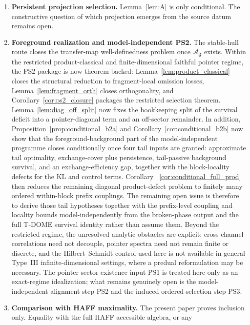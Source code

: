 \documentclass[12pt]{article}
\theoremstyle{definition}
\theoremstyle{remark}
\begin{document}
\begin{enumerate}
\item \textbf{Persistent projection selection.} Lemma~\ref{lem:A} is
  only conditional. The constructive question of which projection
  emerges from the source datum remains open.
\item \textbf{Foreground realization and model-independent PS2.} The
  stable-hull route closes the transfer-map well-definedness problem
  once \(\mathcal A_{\mathfrak F}\) exists. Within the restricted
  product-classical and finite-dimensional faithful pointer regime, the
  PS2 package is now theorem-backed:
  Lemma~\ref{lem:product_classical} closes the structural reduction to
  fragment-local omission losses, Lemma~\ref{lem:fragment_orth} closes
  orthogonality, and Corollary~\ref{cor:ps2_closure} packages the
  restricted selection theorem. Lemma~\ref{lem:diag_off_split} now
  fixes the bookkeeping split of the survival deficit into a
  pointer-diagonal term and an off-sector remainder. In addition,
  Proposition~\ref{prop:conditional_b2a} and
  Corollary~\ref{cor:conditional_b2b} now show that the
  foreground-background part of the model-independent programme closes
  conditionally once four tail inputs are granted: approximate tail
  optimality, exchange-cover plus persistence, tail-passive background
  survival, and an exchange-efficiency gap, together with the
  block-locality defects for the KL and control terms. Corollary~
  \ref{cor:conditional_full_prod} then reduces the remaining diagonal
  product-defect problem to finitely many ordered within-block prefix
  couplings. The remaining open issue is therefore to derive those tail
  hypotheses together with the prefix-level coupling and locality
  bounds model-independently from the broken-phase output and the full
  T-DOME survival identity rather than assume them. Beyond the
  restricted regime, the unresolved analytic obstacles are explicit:
  cross-channel correlations need not decouple, pointer spectra need
  not remain finite or discrete, and the Hilbert--Schmidt control used
  here is not available in general Type~III infinite-dimensional
  settings, where a predual reformulation may be necessary. The
  pointer-sector existence input PS1 is treated here only as an
  exact-regime idealization; what remains genuinely open is the
  model-independent alignment step PS2 and the induced ordered-selection
  step PS3.
\item \textbf{Comparison with HAFF maximality.} The present paper proves
  inclusion only. Equality with the full HAFF accessible algebra, or any

\end{enumerate}
\end{document}
